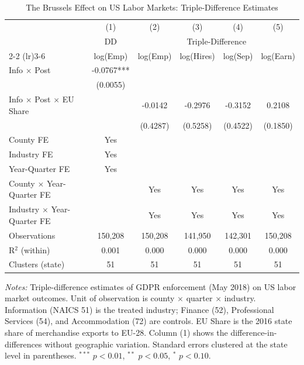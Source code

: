 \begin{table}[t]
\centering
\begin{threeparttable}
\caption{The Brussels Effect on US Labor Markets: Triple-Difference Estimates}
\label{tab:main_ddd}
\small
\begin{tabular}{lccccc}
\toprule
 & (1) & (2) & (3) & (4) & (5) \\
 & \multicolumn{1}{c}{DD} & \multicolumn{4}{c}{Triple-Difference} \\
\cmidrule(lr){2-2} \cmidrule(lr){3-6}
 & log(Emp) & log(Emp) & log(Hires) & log(Sep) & log(Earn) \\
\midrule
Info $\times$ Post & -0.0767*** & & & & \\
 & (0.0055) & & & & \\
Info $\times$ Post $\times$ EU Share & & -0.0142 & -0.2976 & -0.3152 & 0.2108 \\
 & & (0.4287) & (0.5258) & (0.4522) & (0.1850) \\
\midrule
County FE & Yes & & & & \\
Industry FE & Yes & & & & \\
Year-Quarter FE & Yes & & & & \\
County $\times$ Year-Quarter FE & & Yes & Yes & Yes & Yes \\
Industry $\times$ Year-Quarter FE & & Yes & Yes & Yes & Yes \\
Observations & 150,208 & 150,208 & 141,950 & 142,301 & 150,208 \\
R$^2$ (within) & 0.001 & 0.000 & 0.000 & 0.000 & 0.000 \\
Clusters (state) & 51 & 51 & 51 & 51 & 51 \\
\bottomrule
\end{tabular}
\begin{tablenotes}[flushleft]\small
\item \textit{Notes:} Triple-difference estimates of GDPR enforcement (May 2018) on US labor market outcomes. Unit of observation is county $\times$ quarter $\times$ industry. Information (NAICS 51) is the treated industry; Finance (52), Professional Services (54), and Accommodation (72) are controls. EU Share is the 2016 state share of merchandise exports to EU-28. Column (1) shows the difference-in-differences without geographic variation. Standard errors clustered at the state level in parentheses. $^{***}$ $p<0.01$, $^{**}$ $p<0.05$, $^{*}$ $p<0.10$.
\end{tablenotes}
\end{threeparttable}
\end{table}
